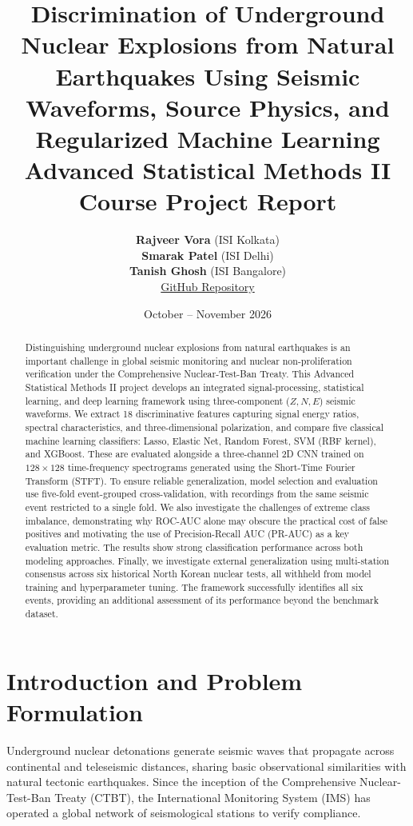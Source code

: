 \documentclass[11pt,a4paper]{article}
\title{\textbf{\Large Discrimination of Underground Nuclear Explosions from Natural Earthquakes Using Seismic Waveforms, Source Physics, and Regularized Machine Learning}\\[0.5em]
\large Advanced Statistical Methods II Course Project Report}
\author{
    \textbf{Rajveer Vora} (ISI Kolkata) \\
    \textbf{Smarak Patel} (ISI Delhi) \\
    \textbf{Tanish Ghosh} (ISI Bangalore) \\[0.5em]
    \href{https://github.com/RajveerVoraUni/nuclear-testing}{GitHub Repository}
}
\date{October -- November 2026}
\begin{document}
\maketitle

\begin{abstract}
Distinguishing underground nuclear explosions from natural earthquakes is an important challenge in global seismic monitoring and nuclear non-proliferation verification under the Comprehensive Nuclear-Test-Ban Treaty. This Advanced Statistical Methods II project develops an integrated signal-processing, statistical learning, and deep learning framework using three-component ($Z, N, E$) seismic waveforms. We extract 18 discriminative features capturing signal energy ratios, spectral characteristics, and three-dimensional polarization, and compare five classical machine learning classifiers: Lasso, Elastic Net, Random Forest, SVM (RBF kernel), and XGBoost. These are evaluated alongside a three-channel 2D CNN trained on $128 \times 128$ time-frequency spectrograms generated using the Short-Time Fourier Transform (STFT). To ensure reliable generalization, model selection and evaluation use five-fold event-grouped cross-validation, with recordings from the same seismic event restricted to a single fold. We also investigate the challenges of extreme class imbalance, demonstrating why ROC-AUC alone may obscure the practical cost of false positives and motivating the use of Precision-Recall AUC (PR-AUC) as a key evaluation metric. The results show strong classification performance across both modeling approaches. Finally, we investigate external generalization using multi-station consensus across six historical North Korean nuclear tests, all withheld from model training and hyperparameter tuning. The framework successfully identifies all six events, providing an additional assessment of its performance beyond the benchmark dataset.
\end{abstract}

\vspace*{0.5em}

\section{Introduction and Problem Formulation}
Underground nuclear detonations generate seismic waves that propagate across continental and teleseismic distances, sharing basic observational similarities with natural tectonic earthquakes. Since the inception of the Comprehensive Nuclear-Test-Ban Treaty (CTBT), the International Monitoring System (IMS) has operated a global network of seismological stations to verify compliance.
\end{document}
